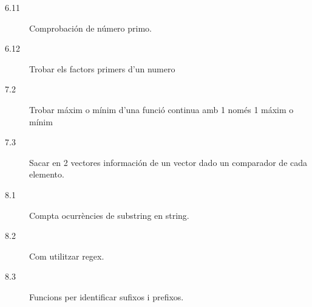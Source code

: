 \begin{description}
\begin{description}
		\item [6.11] Comprobación de número primo.
		\item [6.12] Trobar els factors primers d'un numero
		\item [7.2] Trobar máxim o mínim d'una funció continua amb 1 només 1 máxim o mínim
		\item [7.3] Sacar en 2 vectores información de un vector dado un comparador de cada elemento.
		\item [8.1] Compta ocurrències de substring en string.
		\item [8.2] Com utilitzar regex.
		\item [8.3] Funcions per identificar sufixos i prefixos.
	\end{description}
\end{description}